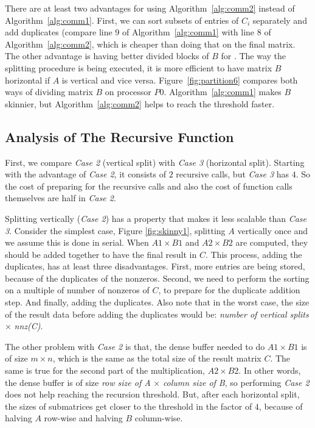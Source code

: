 There are at least two advantages for using Algorithm~\ref{alg:comm2} instead of Algorithm~\ref{alg:comm1}. First, we can sort subsets of entries of $C_i$ separately and add duplicates (compare line 9 of Algorithm~\ref{alg:comm1} with line $8$ of Algorithm~\ref{alg:comm2}, which is cheaper than doing that on the final matrix. The other advantage is having better divided blocks of $B$ for \recmm. The way the splitting procedure is being executed, it is more efficient to have matrix $B$ horizontal if $A$ is vertical and vice versa. Figure~\ref{fig:partition6} compares both ways of dividing matrix $B$ on processor $P0$. Algorithm~\ref{alg:comm1} makes $B$ skinnier, but Algorithm~\ref{alg:comm2} helps to reach the threshold faster.


\subsection{Analysis of The Recursive Function}
\label{sec:compare}

First, we compare \textit{Case 2} (vertical split) with \textit{Case 3} (horizontal split). Starting with the advantage of \textit{Case 2}, it consists of $2$ recursive calls, but \textit{Case 3} has $4$. So the cost of preparing for the recursive calls and also the cost of function calls themselves are half in \textit{Case 2}. 

Splitting vertically (\textit{Case 2}) has a property that makes it less scalable than \textit{Case 3}. Consider the simplest case, Figure \ref{fig:skinny1}, splitting $A$ vertically once and we assume this is done in serial. When $A1 \times B1$ and $A2 \times B2$ are computed, they should be added together to have the final result in $C$. This process, adding the duplicates, has at least three disadvantages. First, more entries are being stored, because of the duplicates of the nonzeros. Second, we need to perform the sorting on a multiple of number of nonzeros of $C$, to prepare for the duplicate addition step. And finally, adding the duplicates. Also note that in the worst case, the size of the result data before adding the duplicates would be: \textit{number of vertical splits} $\times$ \textit{nnz(C)}.  

The other problem with \textit{Case 2} is that, the dense buffer needed to do $A1 \times B1$ is of size $m \times n$, which is the same as the total size of the result matrix $C$. The same is true for the second part of the multiplication, $A2 \times B2$. In other words, the dense buffer is of size \textit{row size of A} $\times$ \textit{column size of B}, so performing \textit{Case 2} does not help reaching the recursion threshold.
But, after each horizontal split, the sizes of submatrices get closer to the threshold in the factor of $4$, because of halving $A$ row-wise and halving $B$ column-wise.

